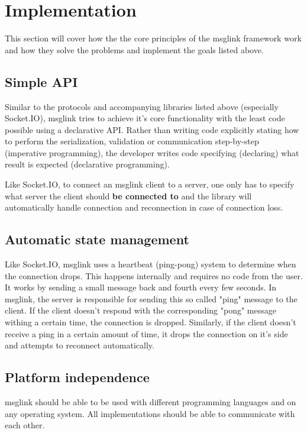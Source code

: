 \documentclass[conference]{IEEEtran}
\begin{document}
\section{Implementation}

This section will cover how the the core principles of the msglink framework work and how they solve the problems and implement the goals listed above.


\subsection{Simple API}

Similar to the protocols and accompanying libraries listed above (especially Socket.IO), msglink tries to achieve it's core functionality with the least code possible using a declarative API. Rather than writing code explicitly stating how to perform the serialization, validation or communication step-by-step (imperative programming), the developer writes code specifying (declaring) what result is expected (declarative programming).

Like Socket.IO, to connect an msglink client to a server, one only has to specify what server the client should \textbf{be connected to} and the library will automatically handle connection and reconnection in case of connection loss. 


\subsection{Automatic state management}

Like Socket.IO, msglink uses a heartbeat (ping-pong) system to determine when the connection drops. This happens internally and requires no code from the user. It works by sending a small message back and fourth every few seconds. In msglink, the server is responsible for sending this so called "ping" message to the client. If the client doesn't respond with the corresponding "pong" message withing a certain time, the connection is dropped. Similarly, if the client doesn't receive a ping in a certain amount of time, it drops the connection on it's side and attempts to reconnect automatically.


\subsection{Platform independence}

msglink should be able to be used with different programming languages and on any operating system. All implementations should be able to communicate with each other.
\end{document}
